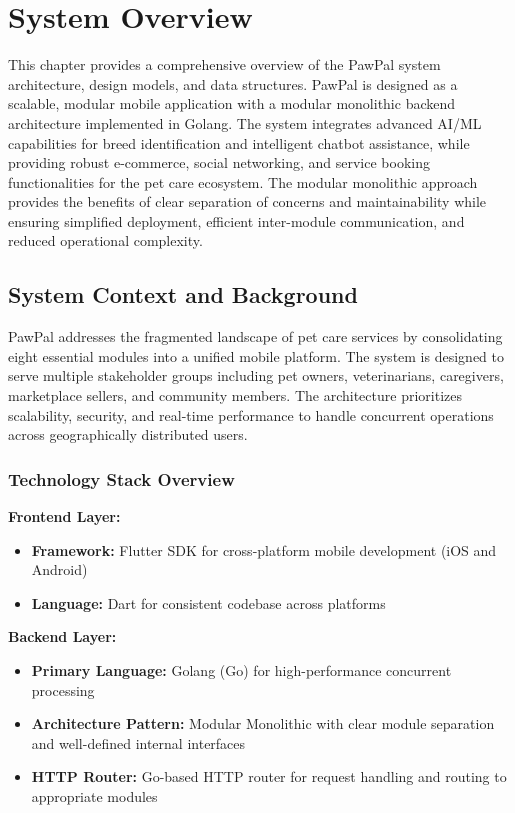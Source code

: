 \chapter{System Overview}

This chapter provides a comprehensive overview of the PawPal system architecture, design models, and data structures. PawPal is designed as a scalable, modular mobile application with a modular monolithic backend architecture implemented in Golang. The system integrates advanced AI/ML capabilities for breed identification and intelligent chatbot assistance, while providing robust e-commerce, social networking, and service booking functionalities for the pet care ecosystem. The modular monolithic approach provides the benefits of clear separation of concerns and maintainability while ensuring simplified deployment, efficient inter-module communication, and reduced operational complexity.

\section{System Context and Background}

PawPal addresses the fragmented landscape of pet care services by consolidating eight essential modules into a unified mobile platform. The system is designed to serve multiple stakeholder groups including pet owners, veterinarians, caregivers, marketplace sellers, and community members. The architecture prioritizes scalability, security, and real-time performance to handle concurrent operations across geographically distributed users.

\subsection{Technology Stack Overview}

\textbf{Frontend Layer:}
\begin{itemize}
    \item \textbf{Framework:} Flutter SDK for cross-platform mobile development (iOS and Android)
    \item \textbf{Language:} Dart for consistent codebase across platforms

\end{itemize}

\textbf{Backend Layer:}
\begin{itemize}
    \item \textbf{Primary Language:} Golang (Go) for high-performance concurrent processing
    \item \textbf{Architecture Pattern:} Modular Monolithic with clear module separation and well-defined internal interfaces
    \item \textbf{HTTP Router:} Go-based HTTP router for request handling and routing to appropriate modules

\end{itemize}

